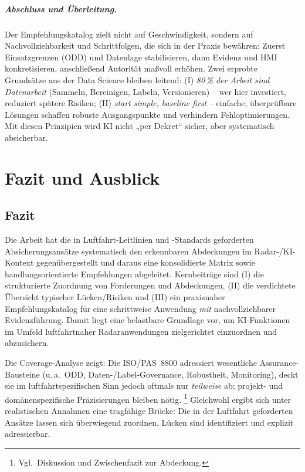 \paragraph{Abschluss und Überleitung.}
Der Empfehlungskatalog zielt nicht auf Geschwindigkeit, sondern auf Nachvollziehbarkeit und Schrittfolgen, die
sich in der Praxis bewähren: Zuerst Einsatzgrenzen (ODD) und Datenlage stabilisieren, dann Evidenz und HMI konkretisieren,
anschließend Autorität maßvoll erhöhen. Zwei erprobte Grundsätze aus der Data Science bleiben leitend: (I) \emph{80\,\% der Arbeit
sind Datenarbeit} (Sammeln, Bereinigen, Labeln, Versionieren) – wer hier investiert, reduziert spätere Risiken; (II) \emph{start
simple, baseline first} – einfache, überprüfbare Lösungen schaffen robuste Ausgangspunkte und verhindern Fehloptimierungen.
Mit diesen Prinzipien wird KI nicht „per Dekret“ sicher, aber systematisch absicherbar.









\chapter{Fazit und Ausblick}\label{chap:fazit-ausblick}

\section{Fazit}
Die Arbeit hat die in Luftfahrt-Leitlinien und -Standards geforderten Absicherungsansätze systematisch 
den erkennbaren Abdeckungen im Radar-/KI-Kontext gegenübergestellt und daraus eine konsolidierte Matrix 
sowie handlungsorientierte Empfehlungen abgeleitet. Kernbeiträge sind (I) die strukturierte Zuordnung von 
Forderungen und Abdeckungen, (II) die verdichtete Übersicht typischer Lücken/Risiken und (III) ein 
praxisnaher Empfehlungskatalog für eine schrittweise Anwendung \emph{mit} nachvollziehbarer Evidenzführung. 
Damit liegt eine belastbare Grundlage vor, um KI-Funktionen im Umfeld luftfahrtnaher Radaranwendungen 
zielgerichtet einzuordnen und abzusichern.
\medskip

Die Coverage-Analyse zeigt: Die ISO/PAS~8800 adressiert wesentliche Assurance-Bausteine 
(u.\,a.\ ODD, Daten-/Label-Governance, Robustheit, Monitoring), deckt sie im luftfahrtspezifischen 
Sinn jedoch oftmals nur \emph{teilweise} ab; projekt- und domänenspezifische Präzisierungen bleiben nötig.
\footnote{Vgl.\ Diskussion und Zwischenfazit zur Abdeckung.} Gleichwohl ergibt sich unter realistischen 
Annahmen eine tragfähige Brücke: Die in der Luftfahrt geforderten Ansätze lassen sich überwiegend zuordnen, 
Lücken sind identifiziert und explizit adressierbar.
\medskip

